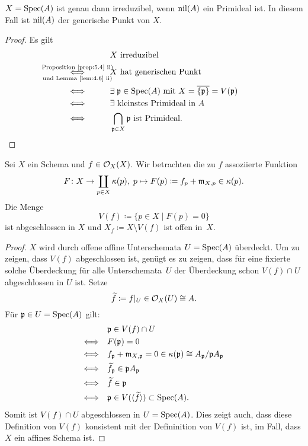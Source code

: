 \begin{lem}
\label{lem:6.3}
	$X=\operatorname{Spec}(A)$ ist genau dann irreduzibel, wenn $\operatorname{nil}(A)$ ein Primideal ist. In diesem Fall ist $\operatorname{nil}(A)$ der generische Punkt von $X$.
	\begin{proof}
		Es gilt
		\begin{align*}
			&X \text{ irreduzibel}\\
			\underset{\mathclap{\text{und Lemma~\ref{lem:4.6} ii)}}}{\overset{\mathclap{\text{Proposition~\ref{prop:5.4} ii)}}}{\Longleftrightarrow}} \qquad\quad & X \text{ hat generischen Punkt}\\
			 \Longleftrightarrow \qquad\quad & \exists\; \mfp \in \Spec(A) \text{ mit } X = \overline{\{\mfp\}} = V(\mfp)\\
			 \Longleftrightarrow \qquad\quad & \exists \text{ kleinstes Primideal in } A\\
			 \Longleftrightarrow \qquad\quad &  \bigcap_{\mfp \in X} \mfp \text{ ist Primideal} .
		\end{align*}
	\end{proof}
\end{lem}

\begin{lem}
\label{lem:6.4}
	Sei $X$ ein Schema und $f \in \mathcal{O}_X(X)$. Wir betrachten die zu $f$ assoziierte Funktion
	\[
		F\colon X \to \coprod_{p \in X}\kappa(p),\; p \mapsto F(p)\coloneqq f_p+\mathfrak{m}_{X,p}\in \kappa(p).
	\]
	Die Menge 
	\[
		V(f) \coloneqq \{p\in X\mid F(p) = 0\}
	\]
	ist abgeschlossen in $X$ und $X_f\coloneqq X \setminus V(f)$ ist offen in~$X$.
	\begin{proof}
		$X$ wird durch offene affine Unterschemata $U=\operatorname{Spec}(A)$ überdeckt. Um zu zeigen, dass $V(f)$ abgeschlossen ist, genügt es zu zeigen, dass für eine fixierte solche Überdeckung für alle Unterschemata~$U$ der Überdeckung schon $V(f)\cap U$ abgeschlossen in $U$ ist. Setze
		\[
			\widetilde{f}\coloneqq f\vert_U\in \mathcal{O}_X(U) \cong A.
		\]
		Für $\mathfrak{p}\in U = \operatorname{Spec}(A)$ gilt:
		\begin{align*}
			&\mathfrak{p} \in V(f) \cap U\\
			\Longleftrightarrow \quad & F(\mathfrak{p})=0\\
			\Longleftrightarrow \quad & f_{\mathfrak{p}}+\mathfrak{m}_{X,\mathfrak{p}} = 0 \in \kappa(\mathfrak{p}) \cong A_{\mathfrak{p}}/\mathfrak{p} A_{\mathfrak{p}}\\
			\Longleftrightarrow \quad & \widetilde{f}_{\mathfrak{p}} \in \mathfrak{p} A_{\mathfrak{p}}\\
			\Longleftrightarrow \quad & \widetilde{f} \in \mathfrak{p}\\
			\Longleftrightarrow \quad & \mathfrak{p} \in V(\langle \widetilde{f} \rangle) \subset \operatorname{Spec}(A) .
		\end{align*}
		Somit ist $V(f)\cap U$ abgeschlossen in $U = \operatorname{Spec}(A)$. Dies zeigt auch, dass diese Definition von $V(f)$ konsistent mit der Defininition von $V(f)$ ist, im Fall, dass $X$ ein affines Schema ist.
	\end{proof}
\end{lem}

